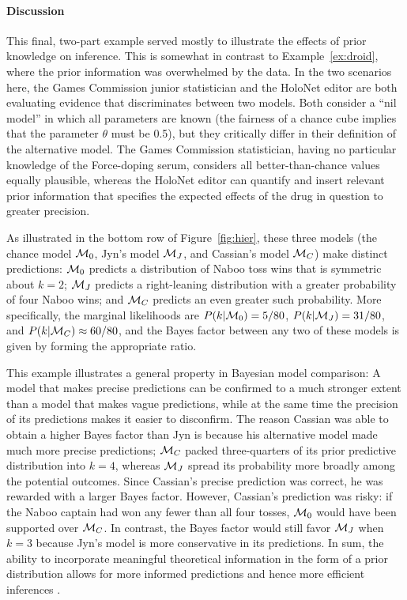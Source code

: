 \paragraph{Discussion} This final, two-part example served mostly to illustrate the effects of prior knowledge on inference. This is somewhat in contrast to Example~\ref{ex:droid}, where the prior information was overwhelmed by the data. In the two scenarios {here,} the Games Commission junior statistician and the HoloNet editor are both evaluating evidence that discriminates between two models. Both consider a ``nil model'' in which all parameters are known (the fairness of a chance cube implies that the parameter $\theta$ must be 0.5), but they critically differ in their definition of the alternative model. The Games Commission statistician, having no particular knowledge of the Force-doping serum, considers all better-than-chance values equally plausible, whereas the HoloNet editor can quantify and insert relevant prior information that specifies the expected effects of the drug in question to greater precision.

As illustrated in the bottom row of Figure~\ref{fig:hier}, these three models (the chance model ${\cal M}_0$, Jyn's model ${\cal M}_J$, and Cassian's model ${\cal M}_C$) make distinct predictions: ${\cal M}_0$ predicts a distribution of Naboo toss wins that is symmetric about $k=2$; ${\cal M}_J$ predicts a right-leaning distribution with a greater probability of four Naboo wins; and ${\cal M}_C$ predicts an even greater such probability. More specifically, the marginal likelihoods are $P(k|{\cal M}_0) =  5/80$, $P(k|{\cal M}_J) = 31/80$, and $P(k|{\cal M}_C) \approx 60/80$, and the Bayes factor between any two of these models is given by forming the appropriate ratio.

This example illustrates a general property in Bayesian model comparison: A model that makes precise predictions can be confirmed to a much stronger extent than a model that makes vague predictions, while at the same time the precision of its predictions makes it easier to disconfirm. The reason Cassian was able to obtain a higher Bayes factor than Jyn is because his alternative model made much more precise predictions; ${\cal M}_C$ packed three-quarters of its prior predictive distribution into $k=4$, whereas ${\cal M}_J$ spread its probability more broadly among the potential outcomes. Since Cassian's precise prediction was correct, he was rewarded with a larger Bayes factor. However, Cassian's prediction was risky: if the Naboo captain had won any fewer than all four tosses, ${\cal M}_0$ would have been supported over ${\cal M}_C$. In contrast, the Bayes factor would still favor ${\cal M}_J$ when $k=3$ because Jyn's model is more conservative in its predictions. In sum, the ability to incorporate meaningful theoretical information in the form of a prior distribution allows for more informed predictions and hence more efficient inferences \cite{LeeSI}.

